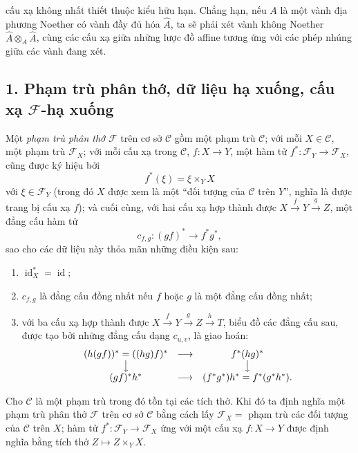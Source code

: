 cấu xạ không nhất thiết thuộc kiểu hữu hạn. Chẳng hạn, nếu $A$ là một vành địa
phương Noether có vành đầy đủ hóa $\widehat A$, ta sẽ phải xét vành không
Noether $\widehat A\otimes_A\widehat A$, cùng các cấu xạ giữa những lược đồ
affine tương ứng với các phép nhúng giữa các vành đang xét.


\subsection*{1. Phạm trù phân thớ, dữ liệu hạ xuống, cấu xạ
$\mathcal F$-hạ xuống}

 Một \emph{phạm trù phân thớ} $\mathcal F$ trên cơ
sở $\mathcal C$ gồm một phạm trù $\mathcal C$; với mỗi
$X\in\mathcal C$, một phạm trù $\mathcal F_X$; với mỗi cấu xạ trong
$\mathcal C$, $f:X\longrightarrow Y$, một hàm tử
$f^*:\mathcal F_Y\longrightarrow\mathcal F_X$, cũng được ký hiệu bởi
\[
  f^*(\xi)=\xi\times_Y X
\]
với $\xi\in\mathcal F_Y$ (trong đó $X$ được xem là một ``đối tượng của
$\mathcal C$ trên $Y$'', nghĩa là được trang bị cấu xạ $f$); và cuối cùng, với
hai cấu xạ hợp thành được
$X\xrightarrow{f}Y\xrightarrow{g}Z$, một đẳng cấu hàm tử
\[
  c_{f,g}:(gf)^*\longrightarrow f^*g^*,
\]
sao cho các dữ liệu này thỏa mãn những điều kiện sau:

\begin{enumerate}
\item[(i)] $\operatorname{id}_X^*=\operatorname{id}$;
\item[(ii)] $c_{f,g}$ là đẳng cấu đồng nhất nếu $f$ hoặc $g$ là một đẳng cấu
đồng nhất;
\item[(iii)] với ba cấu xạ hợp thành được
$X\xrightarrow{f}Y\xrightarrow{g}Z\xrightarrow{h}T$, biểu đồ các đẳng cấu sau,
được tạo bởi những đẳng cấu dạng $c_{u,v}$, là giao hoán:
\[
\begin{array}{ccc}
  (h(gf))^*=((hg)f)^* & \longrightarrow & f^*(hg)^* \\
  \big\downarrow && \big\downarrow \\
  (gf)^*h^* & \longrightarrow & (f^*g^*)h^*=f^*(g^*h^*).
\end{array}
\]
\end{enumerate}

 Cho $\mathcal C$ là một phạm trù trong đó tồn tại các tích
thớ. Khi đó ta định nghĩa một phạm trù phân thớ $\mathcal F$ trên cơ sở
$\mathcal C$ bằng cách lấy $\mathcal F_X=$ phạm trù các đối tượng của
$\mathcal C$ trên $X$; hàm tử
$f^*:\mathcal F_Y\longrightarrow\mathcal F_X$ ứng với một cấu xạ
$f:X\longrightarrow Y$ được định nghĩa bằng tích thớ
$Z\longmapsto Z\times_YX$.

